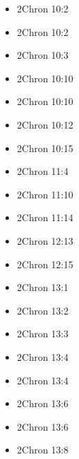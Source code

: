 \documentclass[14pt]{book}
\begin{document}
\begin{multicols}{2}
\begin{itemize}
						\item 2Chron 10:2
						
						\item 2Chron 10:2
						
						\item 2Chron 10:3
						
						\item 2Chron 10:10
						
						\item 2Chron 10:10
						
						\item 2Chron 10:12
						
						\item 2Chron 10:15
						
						\item 2Chron 11:4
						
						\item 2Chron 11:10
						
						\item 2Chron 11:14
						
						\item 2Chron 12:13
						
						\item 2Chron 12:15
						
						\item 2Chron 13:1
						
						\item 2Chron 13:2
						
						\item 2Chron 13:3
				
				\item 2Chron 13:4
				
				\item 2Chron 13:4
				
				\item 2Chron 13:6
				
				\item 2Chron 13:6
				
				\item 2Chron 13:8
				

\end{itemize}
\end{multicols}
\end{document}
